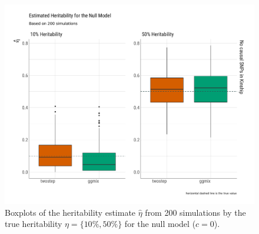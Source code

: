 \documentclass[12pt,letter]{article}\usepackage[]{graphicx}\usepackage[]{color}
\newenvironment{knitrout}{}{} %
\begin{document}
\begin{knitrout}\scriptsize
{}\color{fgcolor}\begin{figure}[H]

{\centering \includegraphics[width=1\linewidth]{figure/plot-eta-sim-null-model-1} 

}

\caption[Boxplots of the heritability estimate $\hat{\eta}$ from 200 simulations by the true heritability $\eta = \lbrace 10\%, 50\% \rbrace$ for the null model ($c=0$)]{Boxplots of the heritability estimate $\hat{\eta}$ from 200 simulations by the true heritability $\eta = \lbrace 10\%, 50\% \rbrace$ for the null model ($c=0$).}\label{fig:plot-eta-sim-null-model}
\end{figure}


\end{knitrout}
\end{document}
